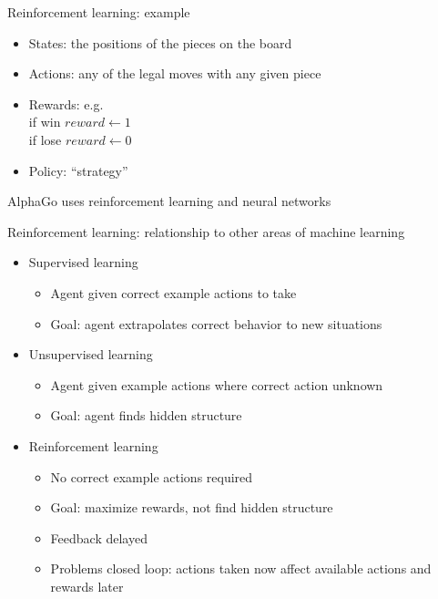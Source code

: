 \documentclass{beamer}
\begin{document}
\begin{frame}[c]{Reinforcement learning: example}

\begin{itemize}
    \item States: the positions of the pieces on the board
    \item Actions: any of the legal moves with any given piece
    \item Rewards: e.g. \\
    if win $reward \gets 1$ \\
    if lose $reward \gets 0$
    \item Policy: ``strategy''
\end{itemize}

AlphaGo uses reinforcement learning and neural networks

\end{frame}

\begin{frame}[c]{Reinforcement learning: relationship to other areas of machine learning}
\begin{itemize}[<+->]
  \item Supervised learning
  \begin{itemize}
    \item Agent given correct example actions to take
    \item Goal: agent extrapolates correct behavior to new situations
  \end{itemize}
  \item Unsupervised learning
  \begin{itemize}
    \item Agent given example actions where correct action unknown
    \item Goal: agent finds hidden structure
  \end{itemize} 
  \item Reinforcement learning
\begin{itemize}
  \item No correct example actions required
  \item Goal: maximize rewards, not find hidden structure
  \item Feedback delayed 
  \item Problems closed loop: actions taken now affect available actions and rewards later
\end{itemize} 
\end{itemize}
\end{frame}
\end{document}

